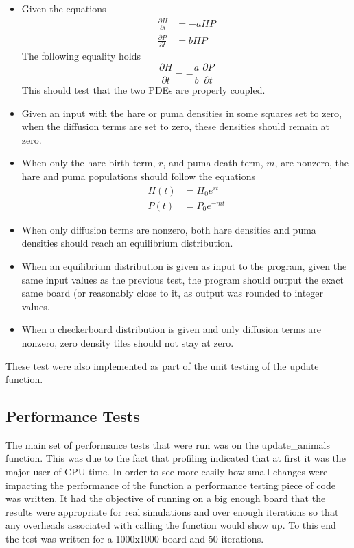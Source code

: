 \begin{itemize}
  \item Given the equations
    \begin{align*}
      \frac{\partial{H}}{\partial{t}} &= -aHP \\
      \frac{\partial{P}}{\partial{t}} &=  bHP
    \end{align*}
    The following equality holds
    \begin{equation*}
      \frac{\partial{H}}{\partial{t}}
        = -\frac{a}{b}\ \frac{\partial{P}}{\partial{t}}
    \end{equation*}
    This should test that the two PDEs are properly coupled.

  \item Given an input with the hare or puma densities in some squares
        set to zero, when the diffusion terms are set to zero, these
        densities should remain at zero.

  \item When only the hare birth term, $r$, and puma death term, $m$, are
        nonzero, the hare and puma populations should follow the equations
        \begin{align*}
          H(t) &= H_0 e^{rt} \\
          P(t) &= P_0 e^{-mt}
        \end{align*}

  \item When only diffusion terms are nonzero, both hare densities and puma
        densities should reach an equilibrium distribution.

  \item When an equilibrium distribution is given as input to the program,
        given the same input values as the previous test, the program should
        output the exact same board (or reasonably close to it, as output was rounded to integer values.

  \item When a checkerboard distribution is given and only diffusion terms
        are nonzero, zero density tiles should not stay at zero.
\end{itemize}

These test were also implemented as part of the unit testing of the update function.


\subsection{Performance Tests}
The main set of performance tests that were run was on the update\_animals function.
This was due to the fact that profiling indicated that at first it was the major user of CPU time.
In order to see more easily how small changes were impacting the performance of the function a performance testing piece of code was written.
It had the objective of running on a big enough board that the results were appropriate for real simulations and over enough iterations so that any overheads associated with calling the function would show up.
To this end the test was written for a 1000x1000 board and 50 iterations.


